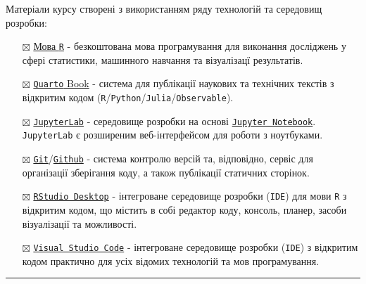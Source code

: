 \documentclass[
  letterpaper,
  DIV=11,
  numbers=noendperiod]{scrreprt}
\begin{document}
\begin{tcolorbox}[enhanced jigsaw, opacityback=0, breakable, arc=.35mm, left=2mm, toprule=.15mm, colframe=quarto-callout-note-color-frame, colback=white, leftrule=.75mm, rightrule=.15mm, bottomrule=.15mm]
\begin{minipage}[t]{5.5mm}
\textcolor{quarto-callout-note-color}{\faInfo}
\end{minipage}%
\begin{minipage}[t]{\textwidth - 5.5mm}

Матеріали курсу створені з використанням ряду технологій та середовищ
розробки:

\begin{itemize}
\item[$\boxtimes$]
  \href{https://www.r-project.org}{Мова \texttt{R}} - безкоштована мова
  програмування для виконання досліджень у сфері статистики, машинного
  навчання та візуалізацї результатів.
\item[$\boxtimes$]
  \href{https://quarto.org}{\texttt{Quarto} Book} - система для
  публікації наукових та технічних текстів з відкритим кодом
  (\texttt{R}/\texttt{Python}/\texttt{Julia}/\texttt{Observable}).
\item[$\boxtimes$]
  \href{https://github.com/jupyterlab/jupyterlab}{\texttt{JupyterLab}} -
  середовище розробки на основі
  \href{https://jupyter.org/}{\texttt{Jupyter\ Notebook}}.
  \texttt{JupyterLab} є розширеним веб-інтерфейсом для роботи з
  ноутбуками.
\item[$\boxtimes$]
  \href{https://git-scm.com/}{\texttt{Git}}/\href{https://github.com/}{\texttt{Github}}
  - система контролю версій та, відповідно, сервіс для організації
  зберігання коду, а також публікації статичних сторінок.
\item[$\boxtimes$]
  \href{https://www.rstudio.com/}{\texttt{RStudio\ Desktop}} -
  інтегроване середовище розробки (\texttt{IDE}) для мови \texttt{R} з
  відкритим кодом, що містить в собі редактор коду, консоль, планер,
  засоби візуалізації та можливості.
\item[$\boxtimes$]
  \href{https://code.visualstudio.com/}{\texttt{Visual\ Studio\ Code}} -
  інтегроване середовище розробки (\texttt{IDE}) з відкритим кодом
  практично для усіх відомих технологій та мов програмування.
\end{itemize}

\end{minipage}%
\end{tcolorbox}

\begin{center}\rule{0.5\linewidth}{0.5pt}\end{center}
\end{document}
